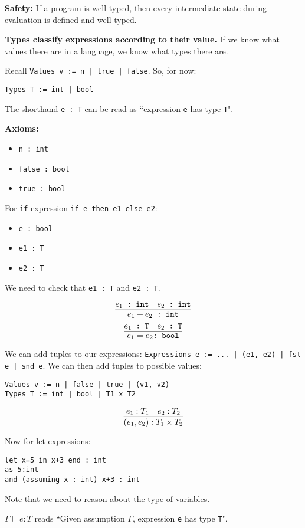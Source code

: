 \documentclass[11pt]{article}
\begin{document}
\textbf{Safety:} If a program is well-typed, then every intermediate state during evaluation is defined and well-typed. 

\textbf{Types classify expressions according to their value.} If we know what values there are in a language, we know what types there are.

Recall \verb~Values v := n | true | false~. So, for now:
\begin{verbatim}
Types T := int | bool
\end{verbatim}

The shorthand \verb~e : T~ can be read as ``expression \verb~e~ has type \verb~T~".

\textbf{Axioms:}
\begin{itemize}
    \item \verb~n : int~
    \item \verb~false : bool~
    \item \verb~true : bool~
\end{itemize}

For \verb~if~-expression \verb~if e then e1 else e2~:
\begin{itemize} 
    \item \verb~e : bool~
    \item \verb~e1 : T~
    \item \verb~e2 : T~
\end{itemize}
We need to check that \verb~e1 : T~ and \verb~e2 : T~.

\[
    \infer{e_1 + e_2 \verb~ : int~}{
        e_1 \verb~ : int~
        &
        e_2 \verb~ : int~
    }
\]
\[
    \infer{e_1 = e_2 \verb~: bool~}{
        e_1 \verb~ : T~
        &
        e_2 \verb~ : T~
    }
\]

We can add tuples to our expressions: \verb~Expressions e := ... | (e1, e2) | fst e | snd e~. We can then add tuples to possible values:
\begin{verbatim}
Values v := n | false | true | (v1, v2)
Types T := int | bool | T1 x T2
\end{verbatim}
\[
    \infer{(e_1, e_2) : T_1 \times T_2}{
        e_1 : T_1
        &
        e_2 : T_2
    }
\]

Now for let-expressions:
\begin{verbatim}
let x=5 in x+3 end : int
as 5:int
and (assuming x : int) x+3 : int
\end{verbatim}

Note that we need to reason about the type of variables.

$\Gamma \vdash e : T$ reads ``Given assumption $\Gamma$, expression \verb~e~ has type \verb~T~". 
\end{document}
